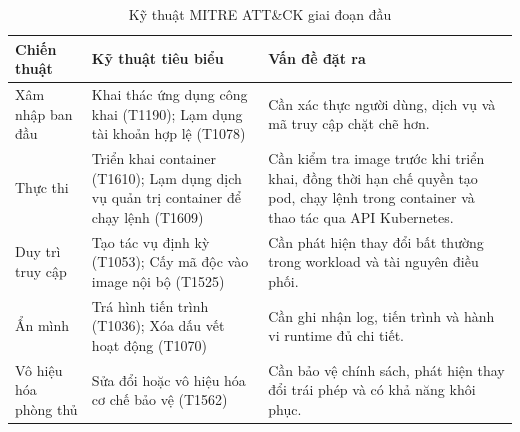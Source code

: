 \begin{table}[H]
\centering
\caption{Kỹ thuật MITRE ATT\&CK giai đoạn đầu}
\label{tab:mitre_phase1}
\renewcommand{\arraystretch}{1.3}
\TableRiskColors
\begin{tabularx}{\textwidth}{|L{3.5cm}|Y|L{4.5cm}|}
\hline
{}
\textbf{Chiến thuật} &
\textbf{Kỹ thuật tiêu biểu} &
\textbf{Vấn đề đặt ra} \\
\hline

Xâm nhập ban đầu &
Khai thác ứng dụng công khai (T1190); Lạm dụng tài khoản hợp lệ (T1078) &
Cần xác thực người dùng, dịch vụ và mã truy cập chặt chẽ hơn. \\
\hline

Thực thi &
Triển khai container (T1610); Lạm dụng dịch vụ quản trị container để chạy lệnh (T1609) &
Cần kiểm tra image trước khi triển khai, đồng thời hạn chế quyền tạo pod, chạy lệnh trong container và thao tác qua API Kubernetes. \\
\hline

Duy trì truy cập &
Tạo tác vụ định kỳ (T1053); Cấy mã độc vào image nội bộ (T1525) &
Cần phát hiện thay đổi bất thường trong workload và tài nguyên điều phối. \\
\hline

Ẩn mình &
Trá hình tiến trình (T1036); Xóa dấu vết hoạt động (T1070) &
Cần ghi nhận log, tiến trình và hành vi runtime đủ chi tiết. \\
\hline

Vô hiệu hóa phòng thủ &
Sửa đổi hoặc vô hiệu hóa cơ chế bảo vệ (T1562) &
Cần bảo vệ chính sách, phát hiện thay đổi trái phép và có khả năng khôi phục. \\
\hline

\end{tabularx}
\end{table}

